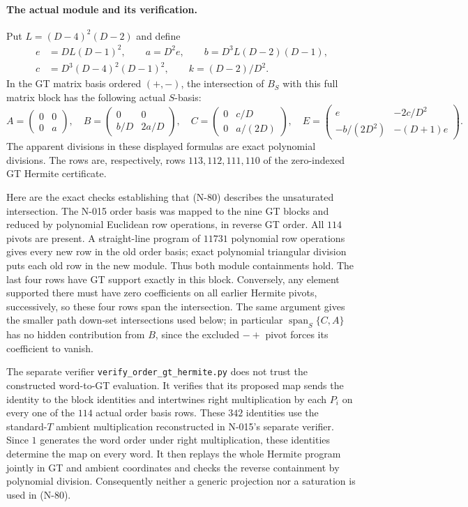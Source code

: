 \paragraph{The actual module and its verification.}
Put $L=(D-4)^2(D-2)$ and define
\[
 \begin{aligned}
 e&=D L(D-1)^2,\qquad a=D^2e,\qquad b=D^3 L(D-2)(D-1),\\
 c&=D^3(D-4)^2(D-1)^2,\qquad k=(D-2)/D^2.
 \end{aligned}
 \tag{N-79}
\]
In the GT matrix basis ordered $(+,-)$, the intersection of $B_S$
with this full matrix block has the following actual $S$-basis:
\[
 A=\begin{pmatrix}0&0\\0&a\end{pmatrix},\quad
 B=\begin{pmatrix}0&0\\ b/D&2a/D\end{pmatrix},\quad
 C=\begin{pmatrix}0&c/D\\0&a/(2D)\end{pmatrix},\quad
 E=\begin{pmatrix}e&-2c/D^2\\-b/(2D^2)&-(D+1)e\end{pmatrix}.
 \tag{N-80}
\]
The apparent divisions in these displayed formulas are exact
polynomial divisions.  The rows are, respectively, rows
$113,112,111,110$ of the zero-indexed GT Hermite certificate.

Here are the exact checks establishing that (N-80) describes the
unsaturated intersection.  The N-015 order basis was mapped to the
nine GT blocks and reduced by polynomial Euclidean row operations,
in reverse GT order.  All $114$ pivots are present.  A straight-line
program of $11731$ polynomial row operations gives every new row in
the old order basis; exact polynomial triangular division puts each
old row in the new module.  Thus both module containments hold.
The last four rows have GT support exactly in this block.  Conversely,
any element supported there must have zero coefficients on all earlier
Hermite pivots, successively, so these four rows span the intersection.
The same argument gives the smaller path down-set intersections used
below; in particular $\operatorname{span}_S\{C,A\}$ has no hidden
contribution from $B$, since the excluded $-+$ pivot forces its
coefficient to vanish.

The separate verifier
\nolinkurl{verify_order_gt_hermite.py} does not trust the constructed
word-to-GT evaluation.  It verifies that its proposed map sends the
identity to the block identities and intertwines right multiplication
by each $P_i$ on every one of the $114$ actual order basis rows.
These $342$ identities use the standard-$T$ ambient multiplication
reconstructed in N-015's separate verifier.  Since $1$ generates the
word order under right multiplication, these identities determine
the map on every word.  It then replays the whole Hermite program
jointly in GT and ambient coordinates and checks the reverse
containment by polynomial division.  Consequently neither a
generic projection nor a saturation is used in (N-80).

